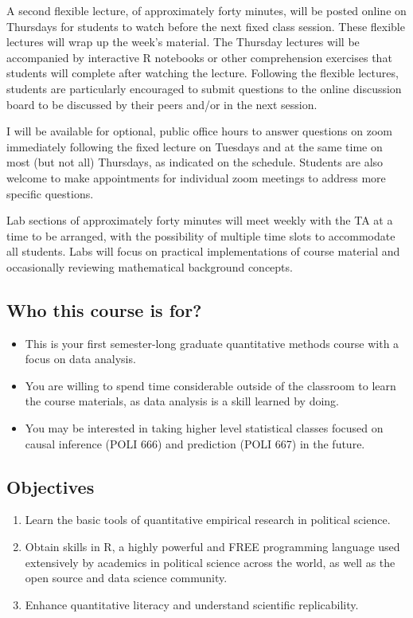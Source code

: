 \documentclass[11pt]{article}
\providecommand{\tightlist}{%
  \setlength{\itemsep}{0pt}\setlength{\parskip}{0pt}}
\begin{document}
A second flexible lecture, of approximately forty minutes, will be posted online on Thursdays for students to watch before the next fixed class session. These flexible lectures will wrap up the week's material. The Thursday lectures will be accompanied by interactive R notebooks or other comprehension exercises that students will complete after watching the lecture. Following the flexible lectures, students are particularly encouraged to submit questions to the online discussion board to be discussed by their peers and/or in the next session. 

I will be available for optional, public office hours to answer questions on zoom immediately following the fixed lecture on Tuesdays and at the same time on most (but not all) Thursdays, as indicated on the schedule. Students are also welcome to make appointments for individual zoom meetings to address more specific questions.

Lab sections of approximately forty minutes will meet weekly with the TA at a time to be arranged, with the possibility of multiple time slots to accommodate all students. Labs will focus on practical implementations of course material and occasionally reviewing mathematical background concepts. 

\subsection*{Who this course is for?}

\begin{itemize}
\tightlist
\item
  This is your first semester-long graduate quantitative methods course
  with a focus on data analysis.
\item
  You are willing to spend time considerable outside of the classroom to
  learn the course materials, as data analysis is a skill learned by
  doing.
  \item You may be interested in taking higher level statistical classes focused on causal inference (POLI 666) and prediction (POLI 667) in the future.
\end{itemize}

\subsection*{Objectives}

\begin{enumerate}
\def\labelenumi{\arabic{enumi}.}
\item
  Learn the basic tools of quantitative empirical research in political science.
\item
  Obtain skills in R, a highly powerful and FREE programming language
  used extensively by academics in political science across the world,
  as well as the open source and data science community.
\item
  Enhance quantitative literacy and understand scientific replicability.
\end{enumerate}
\end{document}
